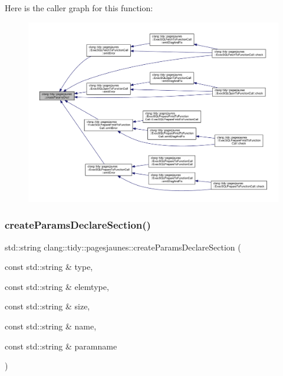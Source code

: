 Here is the caller graph for this function\+:
\nopagebreak
\begin{figure}[H]
\begin{center}
\leavevmode
\includegraphics[width=350pt]{namespaceclang_1_1tidy_1_1pagesjaunes_ac854225e0b2f981f6b0d6f052968fa88_icgraph}
\end{center}
\end{figure}
\mbox{\label{namespaceclang_1_1tidy_1_1pagesjaunes_a99da61353138ae9d98e57b2c77bf025c}} 
\subsubsection{\texorpdfstring{create\+Params\+Declare\+Section()}{createParamsDeclareSection()}}
{\footnotesize\ttfamily std\+::string clang\+::tidy\+::pagesjaunes\+::create\+Params\+Declare\+Section (\begin{DoxyParamCaption}\item[{const std\+::string \&}]{type,  }\item[{const std\+::string \&}]{elemtype,  }\item[{const std\+::string \&}]{size,  }\item[{const std\+::string \&}]{name,  }\item[{const std\+::string \&}]{paramname }\end{DoxyParamCaption})}



